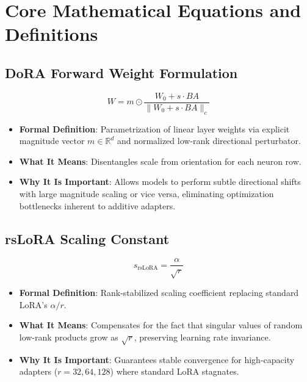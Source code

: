 \documentclass[11pt,a4paper]{article}
\theoremstyle{definition}
\begin{document}
\section{Core Mathematical Equations and Definitions}

\subsection{DoRA Forward Weight Formulation}
{\boldmath
\begin{equation}
W = m \odot \frac{W_0 + s \cdot B A}{\|W_0 + s \cdot B A\|_c}
\end{equation}
}
\begin{itemize}
    \item \textbf{Formal Definition}: Parametrization of linear layer weights via explicit magnitude vector $m \in \mathbb{R}^d$ and normalized low-rank directional perturbator.
    \item \textbf{What It Means}: Disentangles scale from orientation for each neuron row.
    \item \textbf{Why It Is Important}: Allows models to perform subtle directional shifts with large magnitude scaling or vice versa, eliminating optimization bottlenecks inherent to additive adapters.
\end{itemize}

\subsection{rsLoRA Scaling Constant}
{\boldmath
\begin{equation}
s_{\text{rsLoRA}} = \frac{\alpha}{\sqrt{r}}
\end{equation}
}
\begin{itemize}
    \item \textbf{Formal Definition}: Rank-stabilized scaling coefficient replacing standard LoRA's $\alpha / r$.
    \item \textbf{What It Means}: Compensates for the fact that singular values of random low-rank products grow as $\sqrt{r}$, preserving learning rate invariance.
    \item \textbf{Why It Is Important}: Guarantees stable convergence for high-capacity adapters ($r = 32, 64, 128$) where standard LoRA stagnates.
\end{itemize}
\end{document}
